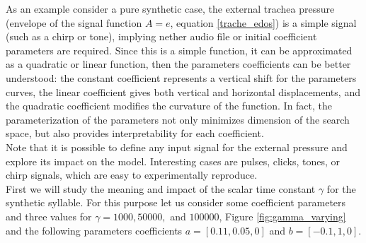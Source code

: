 As an example consider a pure synthetic case, the external trachea pressure (envelope of the signal function $A=e$, equation \eqref{trache_edos}) is a simple signal (such as a chirp or tone), implying nether audio file or initial coefficient parameters are required. Since this is a simple function, it can be approximated as a quadratic or linear function, then the parameters coefficients can be better understood: the constant coefficient represents a vertical shift for the parameters curves, the linear coefficient gives both vertical and horizontal displacements, and the quadratic coefficient modifies the curvature of the function. In fact, the parameterization of the parameters not only minimizes dimension of the search space, but also provides interpretability for each coefficient. \\

Note that it is possible to define any input signal for the external pressure and explore its impact on the model. Interesting cases are pulses, clicks, tones, or chirp signals, which are easy to experimentally reproduce.\\

First we will study the meaning and impact of the scalar time constant $\gamma$ for the synthetic syllable. For this purpose let us consider some coefficient parameters and three values for $\gamma=1000, 50000,$ and $100000$, Figure \ref{fig:gamma_varying} and the following parameters coefficients $ a = [0.11, 0.05, 0]$ and $ b = [-0.1,1,0] $.

